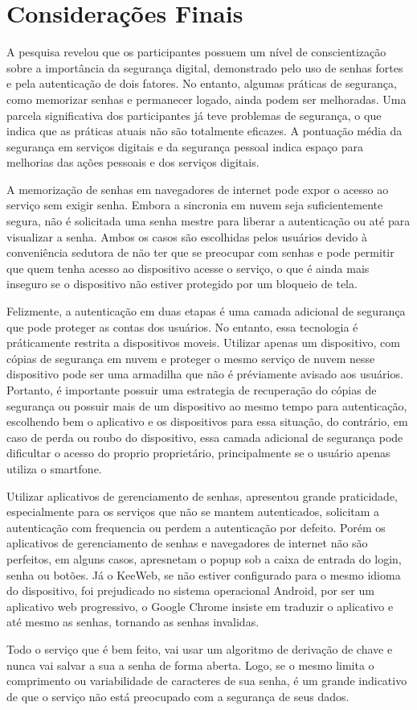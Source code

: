 \documentclass[12pt]{article}
\begin{document}
\section{Considerações Finais}

A pesquisa revelou que os participantes possuem um nível de conscientização sobre
a importância da segurança digital, demonstrado pelo uso de senhas fortes e pela
autenticação de dois fatores.
No entanto, algumas práticas de segurança, como memorizar senhas e permanecer
logado, ainda podem ser melhoradas.
Uma parcela significativa dos participantes já teve problemas de segurança, o que
indica que as práticas atuais não são totalmente eficazes.
A pontuação média da segurança em serviços digitais e da segurança pessoal indica
espaço para melhorias das ações pessoais e dos serviços digitais.

A memorização de senhas em navegadores de internet pode expor o acesso ao serviço
sem exigir senha.
Embora a sincronia em nuvem seja suficientemente segura, não é solicitada uma
senha mestre para liberar a autenticação ou até para visualizar a senha.
Ambos os casos são escolhidas pelos usuários devido à conveniência sedutora de não
ter que se preocupar com senhas e pode permitir que quem tenha acesso ao
dispositivo acesse o serviço, o que é ainda mais inseguro se o dispositivo não
estiver protegido por um bloqueio de tela.


Felizmente, a autenticação em duas etapas é uma camada adicional de segurança que
pode proteger as contas dos usuários.
No entanto, essa tecnologia é práticamente restrita a dispositivos moveis.
Utilizar apenas um dispositivo, com cópias de segurança em nuvem e proteger o mesmo serviço de
nuvem nesse dispositivo pode ser uma armadilha que não é préviamente avisado aos
usuários.
Portanto, é importante possuir uma estrategia de recuperação do cópias de segurança ou possuir
mais de um dispositivo ao mesmo tempo para autenticação, escolhendo bem o
aplicativo e os dispositivos para essa situação, do contrário, em caso de perda
ou roubo do dispositivo, essa camada adicional de segurança pode dificultar o
acesso do proprio proprietário, principalmente se o usuário apenas utiliza o
smartfone.

Utilizar aplicativos de gerenciamento de senhas, apresentou grande praticidade,
especialmente para os serviços que não se mantem autenticados, solicitam a
autenticação com frequencia ou perdem a autenticação por defeito.
Porém os aplicativos de gerenciamento de senhas e navegadores de internet não
são perfeitos, em alguns casos, apresnetam o popup sob a caixa de entrada do
login, senha ou botões.
Já o KeeWeb, se não estiver configurado para o mesmo idioma do dispositivo, foi
prejudicado no sistema operacional Android, por ser um aplicativo web progressivo,
o Google Chrome insiste em traduzir o aplicativo e até mesmo as senhas, tornando
as senhas invalidas.

Todo o serviço que é bem feito, vai usar um algoritmo de derivação de chave e
nunca vai salvar a sua a senha de forma aberta.
Logo, se o mesmo limita o comprimento ou variabilidade de caracteres de sua senha,
é um grande indicativo de que o serviço não está preocupado com a segurança de
seus dados.



\end{document}
